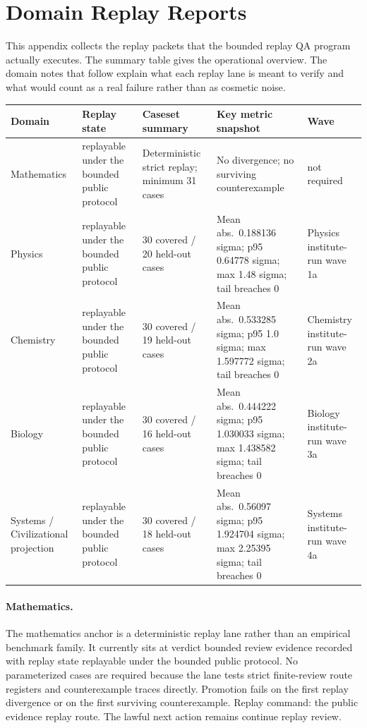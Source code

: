 \section{Domain Replay Reports}
\label{sec:oc-core-1-3-domain-replay-reports}

This appendix collects the replay packets that the bounded replay QA program
actually executes. The summary table gives the operational overview. The domain
notes that follow explain what each replay lane is meant to verify and what
would count as a real failure rather than as cosmetic noise.

\begingroup
\footnotesize
\RaggedRight
\setlength{\tabcolsep}{2pt}
\setlength{\LTleft}{0pt}
\setlength{\LTright}{0pt}

\begin{table}[htbp]
\centering
\begin{tabular}{@{}L{0.15\textwidth}L{0.13\textwidth}L{0.20\textwidth}L{0.27\textwidth}L{0.13\textwidth}@{}}
\toprule
Domain & Replay state & Caseset summary & Key metric snapshot & Wave \\
\midrule
Mathematics & replayable under the bounded public protocol & Deterministic strict replay; minimum 31 cases & No divergence; no surviving counterexample & not required \\
Physics & replayable under the bounded public protocol & 30 covered / 20 held-out cases & Mean abs.\ 0.188136 sigma; p95 0.64778 sigma; max 1.48 sigma; tail breaches 0 & Physics institute-run wave 1a \\
Chemistry & replayable under the bounded public protocol & 30 covered / 19 held-out cases & Mean abs.\ 0.533285 sigma; p95 1.0 sigma; max 1.597772 sigma; tail breaches 0 & Chemistry institute-run wave 2a \\
Biology & replayable under the bounded public protocol & 30 covered / 16 held-out cases & Mean abs.\ 0.444222 sigma; p95 1.030033 sigma; max 1.438582 sigma; tail breaches 0 & Biology institute-run wave 3a \\
Systems / Civilizational projection & replayable under the bounded public protocol & 30 covered / 18 held-out cases & Mean abs.\ 0.56097 sigma; p95 1.924704 sigma; max 2.25395 sigma; tail breaches 0 & Systems institute-run wave 4a \\
\bottomrule
\end{tabular}
\end{table}

\paragraph{Mathematics.}
The mathematics anchor is a deterministic replay lane rather than an empirical
benchmark family. It currently sits at verdict bounded review evidence recorded with replay state
replayable under the bounded public protocol. No parameterized cases are required because the lane
tests strict finite-review route registers and counterexample traces directly. Promotion
fails on the first replay divergence or on the first surviving counterexample.
Replay command:
the public evidence replay route. The
lawful next action remains continue replay review.

